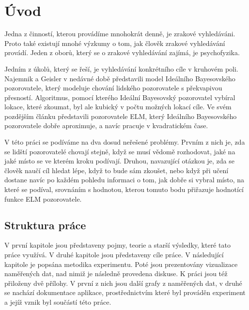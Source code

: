 \chapter*{Úvod}

Jedna z činností, kterou provádíme mnohokrát denně, je zrakové vyhledáváni.
Proto také existují mnohé výzkumy o tom, jak člověk zrakové vyhledávání
provádí. Jeden z oborů, který se o zrakové vyhledávání zajímá, je psychofyzika.

Jedním z úkolů, který se řeší, je vyhledávání konkrétního cíle v kruhovém poli.
Najemnik a Geisler \citeyearpar{Najemnik05} v nedávné době představili model
Ideálního Bayesovského pozorovatele, který modeluje chování lidského
pozorovatele s překvapivou přesností. Algoritmus, pomocí kterého Ideální
Bayesovský pozorovatel vybíral lokace, které zkoumat, byl ale kubický v počtu
možných lokací cíle. Ve svém pozdějším článku \citep{Najemnik09} 
představili pozorovatele ELM, který Ideálního Bayesovského pozorovatele dobře
aproximuje, a navíc pracuje v kvadratickém čase.

V této práci se podíváme na dva dosud neřešené problémy. Prvním z nich je, zda se lidští
pozorovatelé chovají stejně, když se musí vědomě rozhodovat, jaké na jaké místo
se ve kterém kroku podívají. Druhou, navazující otázkou je, zda se člověk naučí
cíl hledat lépe, když to bude sám zkoušet, nebo když při učení dostane navíc po každém pohledu
informaci o tom, jak dobře si vybral místo, na které se podíval, srovnáním s hodnotou, kterou
tomuto bodu přiřazuje hodnotící funkce ELM pozorovatele.

\section*{Struktura práce}

V první kapitole jsou představeny pojmy, teorie a starší výsledky, které tato
práce využívá. V druhé kapitole jsou představeny cíle práce. V následující
kapitole je popsána metodika experimentu. Poté jsou prezentovány vizualizace
naměřených dat, nad nimiž je následně provedena diskuse. K práci jsou též
přiloženy dvě přílohy. V první z nich jsou další grafy z naměřených dat, v
druhé se nachází dokumentace aplikace, prostřednictvím které byl prováděn
experiment a jejíž vznik byl součástí této práce.

